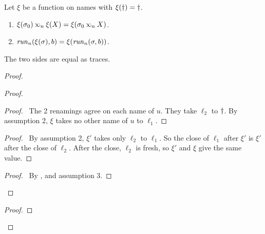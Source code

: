 \begin{lem}[Renaming]\label{lem:rename}
  Let $\xi$ be a function on names with $\xi(\dagger)=\dagger$.
  \begin{enumerate}
    \item $\xi(\sigma_0)\lk{n}\xi(X)=\xi(\sigma_0\lk{n}X)$.
    \item $\mathit{run}_{n}(\xi(\sigma),b)=\xi(\mathit{run}_{n}(\sigma,b))$.
  \end{enumerate}
  The two sides are equal as traces.
\end{lem}
\begin{proof}
  \begin{proof}
    \begin{proof}
      \pf\ The 2 renamings agree on each name of $u$.
      They take $\ell_2$ to $\dagger$.
      By assumption 2, $\xi$ takes no other name of $u$ to $\ell_1$.
    \end{proof}
    \begin{proof}
      \pf\ By assumption 2, $\xi'$ takes only $\ell_2$ to $\ell_1$.
      So the close of $\ell_1$ after $\xi'$ is $\xi'$ after the close of $\ell_2$.
      After the close, $\ell_2$ is fresh, so $\xi'$ and $\xi$ give the same value.
    \end{proof}
    \qedstep
    \begin{proof}
      \pf\ By ,  and assumption 3.
    \end{proof}
  \end{proof}
  \begin{proof}

\end{proof}
\end{proof}

